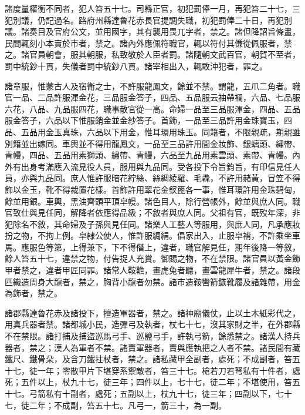 \begin{pinyinscope}
 諸度量權衡不同者，犯人笞五十七。司縣正官，初犯罰俸一月，再犯笞二十七，三犯別議，仍記過名。路府州縣達魯花赤長官提調失職，初犯罰俸二十日，再犯別議。諸奏目及官府公文，並用國字，其有襲用畏兀字者，禁之。諸但降詔旨條畫，民間輒刻小本賣於市者，禁之。諸內外應佩符職官，輒以符付其傔從佩服者，禁之。諸官員朝會，服其朝服，私致敬於人臣者罰。諸隨朝文武百官，朝賀不至者，罰中統鈔十貫，失儀者罰中統鈔八貫。諸宰相出入，輒敢沖犯者，罪之。



 諸章服，惟蒙古人及宿衛之士，不許服龍鳳文，餘並不禁。謂龍，五爪二角者。職官一品、二品許服渾金花，三品服金答子，四品、五品服云袖帶襴，六品、七品服六花，八品、九品服四花，職事散官從一高。命婦一品至三品服渾金，四品、五品服金答子，六品以下惟服銷金並金紗答子。首飾，一品至三品許用金珠寶玉，四品、五品用金玉真珠，六品以下用金，惟耳環用珠玉。同籍者，不限親疏，期親雖別籍並出嫁同。車輿並不得用龍鳳文，一品至三品許用間金妝飾、銀螭頭、繡帶、青幔，四品、五品用素獅頭、繡帶、青幔，六品至九品用素雲頭、素帶、青幔。內外有出身考滿應入流見役人員，服用與九品同。受各投下令旨鈞旨，有印信見任人員，亦與九品同。庶人惟許服暗花紵絲、絲綢綾羅、毛毳，不許用赭黃，冒笠不得飾以金玉，靴不得裁置花樣。首飾許用翠花金釵篦各一事，惟耳環許用金珠碧甸，餘並用銀。車輿，黑油齊頭平頂皁幔。諸色目人，除行營帳外，餘並與庶人同。職官致仕與見任同，解降者依應得品級；不敘者與庶人同。父祖有官，既歿年深，非犯除名不敘，其命婦及子孫與見任同。諸樂人工藝人等服用，與庶人同，凡承應妝扮之物，不拘上例。皁隸公使人，惟許服綢絹。倡家出入，止服皁褙，不許乘坐車馬。應服色等第，上得兼下，下不得僭上，違者，職官解見任，期年後降一等敘，餘人笞五十七，違禁之物，付告捉人充賞。御賜之物，不在禁限。諸官員以黃金飾甲者禁之，違者甲匠同罪。諸常人鞍韂，畫虎兔者聽，畫雲龍犀牛者，禁之。諸段匹織造周身大龍者，禁之，胸背小龍者勿禁。諸市造鞍轡箭鏃靴履及諸雜帶，用金為飾者，禁之。



 諸郡縣達魯花赤及諸投下，擅造軍器者，禁之。諸神廟儀仗，止以土木紙彩代之，用真兵器者禁。諸都城小民，造彈弓及執者，杖七十七，沒其家財之半，在外郡縣不在禁限。諸打捕及捕盜巡馬弓手、巡鹽弓手，許執弓箭，餘悉禁之。諸漢人持兵器者，禁之；漢人為軍者不禁。諸賣軍器者，賣與應執把之人者不禁。諸民間有藏鐵尺、鐵骨朵，及含刀鐵拄杖者，禁之。諸私藏甲全副者，處死；不成副者，笞五十七，徒一年；零散甲片下堪穿系禦敵者，笞三十七。槍若刀若弩私有十件者，處死；五件以上，杖九十七，徒三年；四件以上，七十七，徒二年；不堪使用，笞五十七。弓箭私有十副者，處死；五副以上，杖九十七，徒三年；四副以下，七十七，徒二年；不成副，笞五十七。凡弓一，箭三十，為一副。




\end{pinyinscope}
